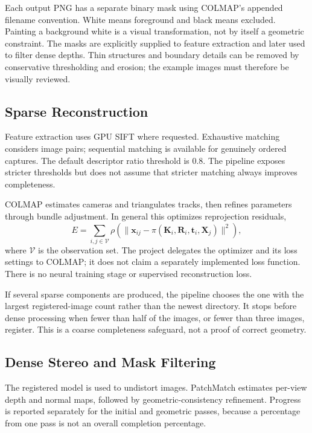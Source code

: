\documentclass[conference]{IEEEtran}
\begin{document}
Each output PNG has a separate binary mask using COLMAP's appended filename convention. White means foreground and black means excluded. Painting a background white is a visual transformation, not by itself a geometric constraint. The masks are explicitly supplied to feature extraction and later used to filter dense depths. Thin structures and boundary details can be removed by conservative thresholding and erosion; the example images must therefore be visually reviewed.

\subsection{Sparse Reconstruction}
Feature extraction uses GPU SIFT where requested. Exhaustive matching considers image pairs; sequential matching is available for genuinely ordered captures. The default descriptor ratio threshold is 0.8. The pipeline exposes stricter thresholds but does not assume that stricter matching always improves completeness.

COLMAP estimates cameras and triangulates tracks, then refines parameters through bundle adjustment. In general this optimizes reprojection residuals,
\begin{equation}
E=\sum_{i,j\in\mathcal{V}}\rho\!\left(\|\mathbf{x}_{ij}-\pi(\mathbf{K}_i,\mathbf{R}_i,\mathbf{t}_i,\mathbf{X}_j)\|^2\right),
\end{equation}
where $\mathcal{V}$ is the observation set. The project delegates the optimizer and its loss settings to COLMAP; it does not claim a separately implemented loss function. There is no neural training stage or supervised reconstruction loss.

If several sparse components are produced, the pipeline chooses the one with the largest registered-image count rather than the newest directory. It stops before dense processing when fewer than half of the images, or fewer than three images, register. This is a coarse completeness safeguard, not a proof of correct geometry.

\subsection{Dense Stereo and Mask Filtering}
The registered model is used to undistort images. PatchMatch estimates per-view depth and normal maps, followed by geometric-consistency refinement. Progress is reported separately for the initial and geometric passes, because a percentage from one pass is not an overall completion percentage.
\end{document}
